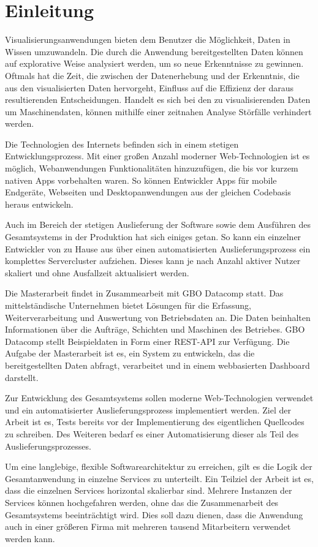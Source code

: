 \chapter{Einleitung}
\label{chap:einleitung}
Visualisierungsanwendungen bieten dem Benutzer die Möglichkeit,
Daten in Wissen umzuwandeln. Die durch die Anwendung bereitgestellten
Daten können auf explorative Weise analysiert werden, um so neue
Erkenntnisse zu gewinnen. Oftmals hat die Zeit, die zwischen der 
Datenerhebung und der Erkenntnis, die aus den visualisierten Daten hervorgeht,
Einfluss auf die Effizienz der daraus resultierenden Entscheidungen.
Handelt es sich bei den zu visualisierenden Daten um Maschinendaten,
können mithilfe einer zeitnahen Analyse Störfälle verhindert werden.

Die Technologien des Internets befinden sich in einem stetigen Entwicklungsprozess.
Mit einer großen Anzahl moderner Web-Technologien ist es möglich, Webanwendungen Funktionalitäten
hinzuzufügen, die bis vor kurzem nativen Apps vorbehalten waren. So können Entwickler
Apps für mobile Endgeräte, Webseiten und Desktopanwendungen aus der gleichen Codebasis
heraus entwickeln.

Auch im Bereich der stetigen Auslieferung der Software sowie dem Ausführen des Gesamtsystems in der 
Produktion hat sich einiges getan. So kann ein einzelner Entwickler von zu Hause aus über einen automatisierten 
Auslieferungsprozess ein komplettes Servercluster aufziehen. Dieses kann je nach Anzahl aktiver Nutzer skaliert
und ohne Ausfallzeit aktualisiert werden.

Die Masterarbeit findet in Zusammearbeit mit GBO Datacomp statt.
Das mittelständische Unternehmen bietet Lösungen für die Erfassung,
Weiterverarbeitung und Auswertung von Betriebsdaten an. Die Daten
beinhalten Informationen über die Aufträge, Schichten und Maschinen
des Betriebes. GBO Datacomp stellt Beispieldaten in Form einer REST-API
zur Verfügung. Die Aufgabe der Masterarbeit ist es, ein System zu entwickeln,
das die bereitgestellten Daten abfragt, verarbeitet und in einem webbasierten
Dashboard darstellt. 

Zur Entwicklung des Gesamtsystems sollen moderne Web-Technologien verwendet
und ein automatisierter Auslieferungsprozess implementiert werden. Ziel der Arbeit ist es,
Tests bereits vor der Implementierung des eigentlichen Quellcodes zu schreiben. Des Weiteren 
bedarf es einer Automatisierung dieser als Teil des Auslieferungsprozesses. 

Um eine langlebige, flexible Softwarearchitektur zu erreichen, gilt es die Logik
der Gesamtanwendung in einzelne Services zu unterteilt. Ein Teilziel der Arbeit
ist es, dass die einzelnen Services horizontal skalierbar sind. Mehrere Instanzen
der Services können hochgefahren werden, ohne das die Zusammenarbeit
des Gesamtsystems beeinträchtigt wird. Dies soll dazu dienen, dass die Anwendung
auch in einer größeren Firma mit mehreren tausend Mitarbeitern verwendet werden kann.

